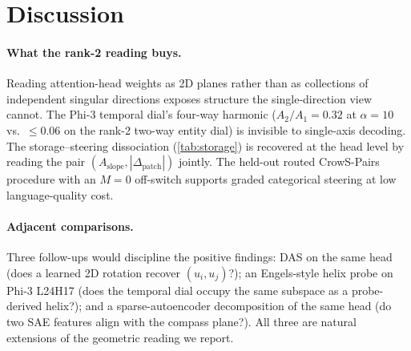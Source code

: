 \section{Discussion}
\label{sec:discussion}

\paragraph{What the rank-2 reading buys.}
Reading attention-head weights as 2D planes rather than as
collections of independent singular directions exposes structure
the single-direction view cannot. The Phi-3 temporal dial's
four-way harmonic ($A_2/A_1 = 0.32$ at $\alpha = 10$ vs.\
$\leq 0.06$ on the rank-2 two-way entity dial) is invisible to
single-axis decoding. The storage--steering dissociation
(\cref{tab:storage}) is recovered at the head level by reading
the pair $(A_{\mathrm{slope}}, |\Delta_{\mathrm{patch}}|)$ jointly.
The held-out routed CrowS-Pairs procedure with an $M = 0$
off-switch supports graded categorical steering at low
language-quality cost.

\paragraph{Adjacent comparisons.}
Three follow-ups would discipline the positive findings: DAS
\citep{geiger2024das} on the same head (does a learned 2D rotation
recover $(u_i, u_j)$?); an Engels-style helix probe
\citep{engels2024not} on Phi-3 L24H17 (does the temporal dial
occupy the same subspace as a probe-derived helix?); and a
sparse-autoencoder decomposition
\citep{cunningham2023sparse,templeton2024scaling} of the same head
(do two SAE features align with the compass plane?). All three are
natural extensions of the geometric reading we report.
